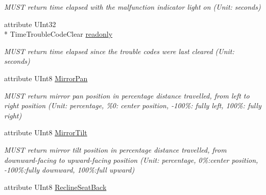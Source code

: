 \begin{DoxyCompactItemize}
\begin{DoxyCompactList}\small\item\em M\+U\+S\+T return time elapsed with the malfunction indicator light on (Unit\+: seconds) \end{DoxyCompactList}\item 
\hypertarget{interfaceVehiclePropertyType_ac56185888e2711efd33aeff8fe9d0063}{attribute U\+Int32 \\*
Time\+Trouble\+Code\+Clear \hyperlink{interfaceVehiclePropertyType_ac56185888e2711efd33aeff8fe9d0063}{readonly}}\label{interfaceVehiclePropertyType_ac56185888e2711efd33aeff8fe9d0063}

\begin{DoxyCompactList}\small\item\em M\+U\+S\+T return time elapsed since the trouble codes were last cleared (Unit\+: seconds) \end{DoxyCompactList}\item 
\hypertarget{interfaceVehiclePropertyType_a22e6512b56a5eb121501fb22c6fabbf9}{attribute U\+Int8 \hyperlink{interfaceVehiclePropertyType_a22e6512b56a5eb121501fb22c6fabbf9}{Mirror\+Pan}}\label{interfaceVehiclePropertyType_a22e6512b56a5eb121501fb22c6fabbf9}

\begin{DoxyCompactList}\small\item\em M\+U\+S\+T return mirror pan position in percentage distance travelled, from left to right position (Unit\+: percentage, \%0\+: center position, -\/100\%\+: fully left, 100\%\+: fully right) \end{DoxyCompactList}\item 
\hypertarget{interfaceVehiclePropertyType_af50eac0ab7c16089cc591665abe45b39}{attribute U\+Int8 \hyperlink{interfaceVehiclePropertyType_af50eac0ab7c16089cc591665abe45b39}{Mirror\+Tilt}}\label{interfaceVehiclePropertyType_af50eac0ab7c16089cc591665abe45b39}

\begin{DoxyCompactList}\small\item\em M\+U\+S\+T return mirror tilt position in percentage distance travelled, from downward-\/facing to upward-\/facing position (Unit\+: percentage, 0\%\+:center position, -\/100\%\+:fully downward, 100\%\+:full upward) \end{DoxyCompactList}\item 
\hypertarget{interfaceVehiclePropertyType_a6dabef41941be10441f3ef763cf43cbf}{attribute U\+Int8 \hyperlink{interfaceVehiclePropertyType_a6dabef41941be10441f3ef763cf43cbf}{Recline\+Seat\+Back}}\label{interfaceVehiclePropertyType_a6dabef41941be10441f3ef763cf43cbf}


\end{DoxyCompactItemize}
